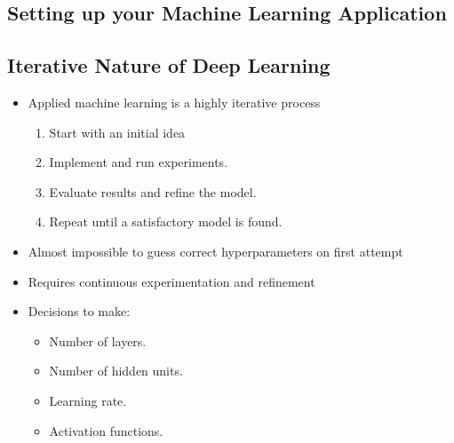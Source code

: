 \documentclass[letterpaper,12pt,notitlepage,twoside]{report}
\begin{document}
\subsection{Setting up your Machine Learning Application}
\subsection*{Iterative Nature of Deep Learning}
\begin{itemize}[leftmargin=*,  nosep]
    \item Applied machine learning is a highly iterative process
	\begin{enumerate}[nosep]
	\item Start with an initial idea
	\item Implement and run experiments.
	\item Evaluate results and refine the model.
	\item Repeat until a satisfactory model is found.
	\end{enumerate}
    \item Almost impossible to guess correct hyperparameters on first attempt
    \item Requires continuous experimentation and refinement
    \item Decisions to make:
	\begin{itemize}[nosep]
	\item Number of layers.
	\item Number of hidden units.
	\item Learning rate.
	\item Activation functions.
	\end{itemize}
\end{itemize}

\end{document}
